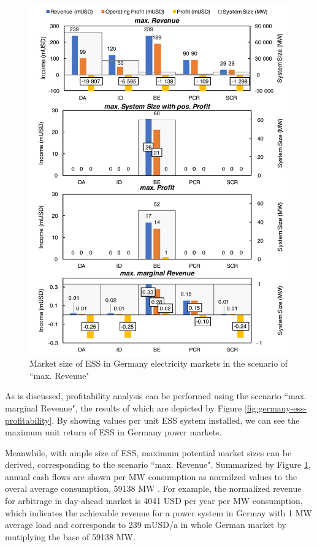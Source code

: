 \begin{figure}[h!]
	\centering
	\includegraphics[width=0.9\linewidth]{Figures/Germany_ESS}
	\caption{Market size of ESS in Germany electricity markets in the scenario of ``max. Revenue"}
	\label{fig:germany-ess}
\end{figure}

As is discussed, profitability analysis can be performed using the scenario ``max. marginal Revenue", the results of which are depicted by Figure \ref{fig:germany-ess-profitability}. By showing values per unit ESS system installed, we can see the maximum unit return of ESS in Germany power markets. 

Meanwhile, with ample size of ESS, maximum potential market sizes can be derived, corresponding to the scenario ``max. Revenue".
Summarized by Figure \ref{fig:germany-ess}, annual cash flows are shown per MW consumption as normilzed values to the overal average consumption, \num{59138} MW . For example, the normalized revenue for arbitrage in day-ahead market is \num{4041} USD per year per MW consumption, which indicates the achievable revenue for a power system in Germay with 1 MW average load and corresponds to 239 mUSD/a in whole German market by mutiplying the base of \num{59138} MW.

